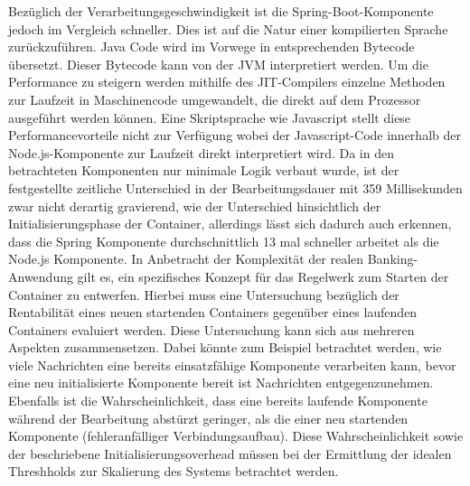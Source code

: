 Bezüglich der Verarbeitungsgeschwindigkeit ist die Spring-Boot-Komponente jedoch im Vergleich schneller. Dies ist auf die Natur einer kompilierten Sprache zurückzuführen. Java Code wird im Vorwege in entsprechenden Bytecode übersetzt. Dieser Bytecode kann von der JVM interpretiert werden. Um die Performance zu steigern werden mithilfe des JIT-Compilers einzelne Methoden zur Laufzeit in Maschinencode umgewandelt, die direkt auf dem Prozessor ausgeführt werden können. Eine Skriptsprache wie Javascript stellt diese Performancevorteile nicht zur Verfügung wobei der Javascript-Code innerhalb der Node.js-Komponente zur Laufzeit direkt interpretiert wird. Da in den betrachteten Komponenten nur minimale Logik verbaut wurde, ist der festgestellte zeitliche Unterschied in der Bearbeitungsdauer mit 359  Millisekunden zwar nicht derartig gravierend, wie der Unterschied hinsichtlich der Initialisierungsphase der Container, allerdings lässt sich dadurch auch erkennen, dass die Spring Komponente durchschnittlich 13 mal schneller arbeitet als die Node.js Komponente. In Anbetracht der Komplexität der realen Banking-Anwendung gilt es, ein spezifisches Konzept für das Regelwerk zum Starten der Container zu entwerfen. Hierbei muss eine Untersuchung bezüglich der Rentabilität eines neuen startenden Containers gegenüber eines laufenden Containers evaluiert werden. Diese Untersuchung kann sich aus mehreren Aspekten zusammensetzen. Dabei könnte zum Beispiel betrachtet werden, wie viele Nachrichten eine bereits einsatzfähige Komponente verarbeiten kann, bevor eine neu initialisierte Komponente bereit ist Nachrichten entgegenzunehmen. Ebenfalls ist die Wahrscheinlichkeit, dass eine bereits laufende Komponente während der Bearbeitung abstürzt geringer, als die einer neu startenden Komponente (fehleranfälliger Verbindungsaufbau). Diese Wahrscheinlichkeit sowie der beschriebene Initialisierungsoverhead müssen bei der Ermittlung der idealen Threshholds zur Skalierung des Systems betrachtet werden.

